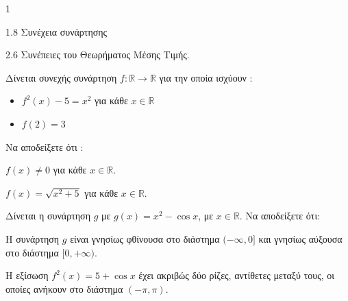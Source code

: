 \begin{ylh}{1}
    \item 1.8 Συνέχεια συνάρτησης
    \item 2.6 Συνέπειες του Θεωρήματος Μέσης Τιμής.
\end{ylh}
Δίνεται συνεχής συνάρτηση $f : \mathbb{R} \to \mathbb{R}$ για την οποία ισχύουν :
\begin{itemize}
    \item $f^2(x) - 5 = x^2$ για κάθε $x \in \mathbb{R}$
    \item $f(2) = 3$
\end{itemize}

\begin{alist}
    \item Να αποδείξετε ότι :
    \begin{rlist}
        \item $f(x) \neq 0$ για κάθε $x \in \mathbb{R}$. 
        \item $f(x) = \sqrt{x^2 + 5}$ για κάθε $x \in \mathbb{R}$. 
    \end{rlist}
    \item Δίνεται η συνάρτηση $g$ με $g(x) = x^2 - \cos x$, με $x \in \mathbb{R}$. Να αποδείξετε ότι:
    \begin{rlist}
        \item Η συνάρτηση $g$ είναι γνησίως φθίνουσα στο διάστημα $(-\infty, 0]$ και γνησίως αύξουσα στο διάστημα $[0, +\infty)$. 
        \item Η εξίσωση $f^2(x) = 5 + \cos x$ έχει ακριβώς δύο ρίζες, αντίθετες μεταξύ τους, οι οποίες ανήκουν στο διάστημα $(-\pi,\pi)$. 
    \end{rlist}
\end{alist}